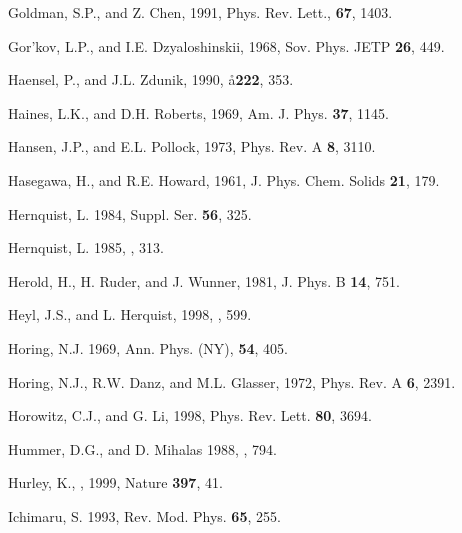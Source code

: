 \begin{references}
\harvarditem{}{}{}
Goldman, S.P., and Z. Chen, 1991, Phys. Rev. Lett., {\bf 67}, 1403.

\harvarditem{}{}{}
Gor'kov, L.P., and I.E. Dzyaloshinskii, 1968,
Sov. Phys. JETP {\bf 26}, 449.

\harvarditem{}{}{}
Haensel, P., and J.L. Zdunik, 1990, \aa {\bf 222}, 353.

\harvarditem{}{}{}
Haines, L.K., and D.H. Roberts, 1969, Am. J. Phys. {\bf 37}, 1145.


\harvarditem{}{}{}
Hansen, J.P., and E.L. Pollock, 1973, Phys. Rev. A {\bf 8}, 3110.

\harvarditem{}{}{}
Hasegawa, H., and R.E. Howard, 1961, J. Phys. Chem. Solids
{\bf 21}, 179.

\harvarditem{}{}{}
Hernquist, L. 1984, \apj Suppl. Ser. {\bf 56}, 325.

\harvarditem{}{}{}
Hernquist, L. 1985, , 313.

\harvarditem{}{}{}
Herold, H., H. Ruder, and J. Wunner, 1981, J. Phys. B {\bf 14}, 751.

\harvarditem{}{}{}
Heyl, J.S., and L. Herquist, 1998, , 599.


\harvarditem{}{}{}
Horing, N.J. 1969, Ann. Phys. (NY), {\bf 54}, 405.

\harvarditem{}{}{}
Horing, N.J., R.W. Danz, and M.L. Glasser, 1972, Phys. Rev. A {\bf 6}, 
2391.

\harvarditem{}{}{}
Horowitz, C.J., and G. Li, 1998, Phys. Rev. Lett. {\bf 80}, 3694.

\harvarditem{}{}{}
Hummer, D.G., and D. Mihalas 1988, , 794.

\harvarditem{}{}{}
Hurley, K., \etal, 1999, Nature {\bf 397}, 41.

\harvarditem{}{}{}
Ichimaru, S. 1993, Rev. Mod. Phys. {\bf 65}, 255.


\end{references}
